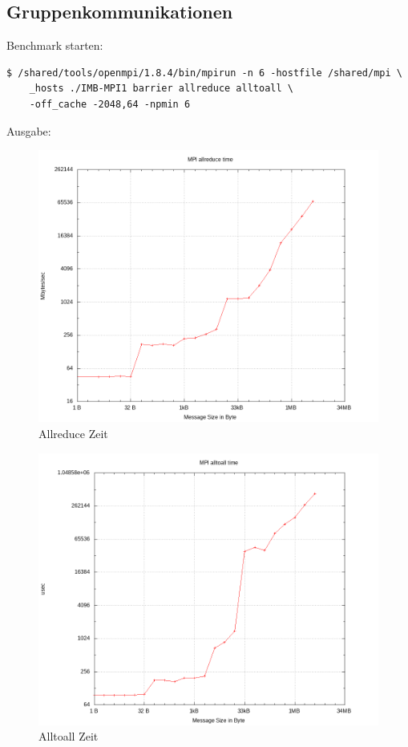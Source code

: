 \subsection{Gruppenkommunikationen}
Benchmark starten:
\begin{lstlisting}[style=Bash]
$ /shared/tools/openmpi/1.8.4/bin/mpirun -n 6 -hostfile /shared/mpi \
    _hosts ./IMB-MPI1 barrier allreduce alltoall \
	-off_cache -2048,64 -npmin 6
\end{lstlisting}
Ausgabe:

\begin{figure}[H]
	\centering
	\includegraphics[scale=0.65]{../mpi_benchmark/allreduce_time.png}
	\caption{Allreduce Zeit}
\end{figure}
\begin{figure}[H]
	\centering
	\includegraphics[scale=0.65]{../mpi_benchmark/alltoall_time.png}
	\caption{Alltoall Zeit}
\end{figure}
